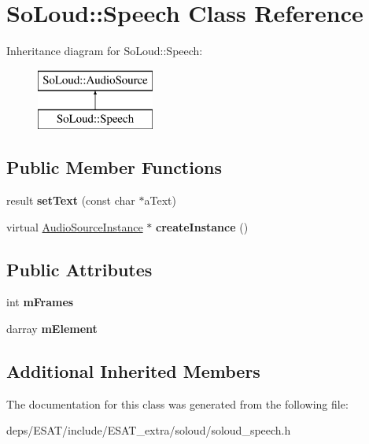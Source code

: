 \hypertarget{class_so_loud_1_1_speech}{}\section{So\+Loud\+:\+:Speech Class Reference}
\label{class_so_loud_1_1_speech}
Inheritance diagram for So\+Loud\+:\+:Speech\+:\begin{figure}[H]
\begin{center}
\leavevmode
\includegraphics[height=2.000000cm]{class_so_loud_1_1_speech}
\end{center}
\end{figure}
\subsection*{Public Member Functions}
\begin{DoxyCompactItemize}
\item 
\mbox{\label{class_so_loud_1_1_speech_a3c7ca61fa3aa9ce1d665b3fcc05dcfb4}} 
result {\bfseries set\+Text} (const char $\ast$a\+Text)
\item 
\mbox{\label{class_so_loud_1_1_speech_ad2a53fab95676c6e82f17a3535a81d6a}} 
virtual \mbox{\hyperlink{class_so_loud_1_1_audio_source_instance}{Audio\+Source\+Instance}} $\ast$ {\bfseries create\+Instance} ()
\end{DoxyCompactItemize}
\subsection*{Public Attributes}
\begin{DoxyCompactItemize}
\item 
\mbox{\label{class_so_loud_1_1_speech_ad62f0bffce5369f20004302215f3e80f}} 
int {\bfseries m\+Frames}
\item 
\mbox{\label{class_so_loud_1_1_speech_a72021ae8bba4e2a66fa096de0bb0d0f8}} 
darray {\bfseries m\+Element}
\end{DoxyCompactItemize}
\subsection*{Additional Inherited Members}


The documentation for this class was generated from the following file\+:\begin{DoxyCompactItemize}
\item 
deps/\+E\+S\+A\+T/include/\+E\+S\+A\+T\+\_\+extra/soloud/soloud\+\_\+speech.\+h\end{DoxyCompactItemize}
